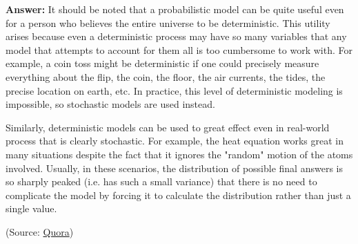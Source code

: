 \documentclass{article}
\newenvironment{QandA}{\begin{enumerate}[label=\arabic*.]}{\end{enumerate}}
\newenvironment{answer}{\par\normalfont \textbf{Answer:}}{}
\begin{document}
\begin{QandA}
\begin{answer}
        It should be noted that a probabilistic model can be quite useful even for a person who believes the entire universe to be deterministic. This utility arises because even a deterministic process may have so many variables that any model that attempts to account for them all is too cumbersome to work with. For example, a coin toss might be deterministic if one could precisely measure everything about the flip, the coin, the floor, the air currents, the tides, the precise location on earth, etc. In practice, this level of deterministic modeling is impossible, so stochastic models are used instead. 
        
        Similarly, deterministic models can be used to great effect even in real-world process that is clearly stochastic. For example, the heat equation works great in many situations despite the fact that it ignores the "random" motion of the atoms involved. Usually, in these scenarios, the distribution of possible final answers is so sharply peaked (i.e. has such a small variance) that there is no need to complicate the model by forcing it to calculate the distribution rather than just a single value.
        
        (Source: \href{https://www.quora.com/What-is-the-difference-between-probabilistic-and-deterministic-models}{Quora})
    \end{answer}


\end{QandA}
\end{document}
